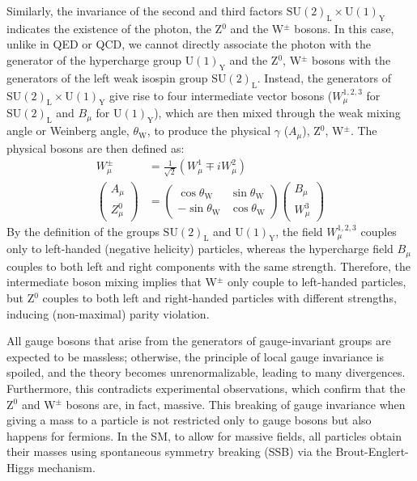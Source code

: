 Similarly, the invariance of the second and third factors $\text{SU}(2)_{\text{L}}\times \text{U}(1)_{\text{Y}}$ indicates the existence of the photon, the Z$^{0}$ and the W$^{\pm}$ bosons. In this case, unlike in QED or QCD, we cannot directly associate the photon with the generator of the hypercharge group $\text{U}(1)_{\text{Y}}$ and the Z$^{0}$, W$^{\pm}$ bosons with the generators of the left weak isospin group $\text{SU}(2)_{\text{L}}$. Instead, the generators of $\text{SU}(2)_{\text{L}}\times \text{U}(1)_{\text{Y}}$ give rise to four intermediate vector bosons ($W_\mu^{1,2,3}$ for $\text{SU}(2)_{\text{L}}$ and $B_\mu$ for $\text{U}(1)_{\text{Y}}$), which are then mixed through the weak mixing angle or Weinberg angle, $\theta_{\text{W}}$, to produce the physical $\gamma$ ($A_\mu$), Z$^{0}$, W$^{\pm}$. The physical bosons are then defined as:
\begin{align*}
    W_\mu^{\pm} &= \frac{1}{\sqrt{2}}(W_\mu^{1}\mp iW_\mu^{2})\\
    \begin{pmatrix}
        A_\mu \\
        Z^{0}_\mu
    \end{pmatrix}
    &=
    \begin{pmatrix}
        \cos{\theta_{\text{W}}} & \sin{\theta_{\text{W}}} \\
        -\sin{\theta_{\text{W}}} & \cos{\theta_{\text{W}}}
    \end{pmatrix}
    \begin{pmatrix}
        B_\mu \\
        W^{3}_\mu
    \end{pmatrix}
\end{align*}
By the definition of the groups $\text{SU}(2)_{\text{L}}$ and $\text{U}(1)_{\text{Y}}$, the field $W_\mu^{1,2,3}$ couples only to left-handed (negative helicity) particles, whereas the hypercharge field $B_\mu$ couples to both left and right components with the same strength. Therefore, the intermediate boson mixing implies that W$^{\pm}$ only couple to left-handed particles, but Z$^{0}$ couples to both left and right-handed particles with different strengths, inducing (non-maximal) parity violation.

All gauge bosons that arise from the generators of gauge-invariant groups are expected to be massless; otherwise, the principle of local gauge invariance is spoiled, and the theory becomes unrenormalizable, leading to many divergences. Furthermore, this contradicts experimental observations, which confirm that the Z$^{0}$ and W$^{\pm}$ bosons are, in fact, massive. This breaking of gauge invariance when giving a mass to a particle is not restricted only to gauge bosons but also happens for fermions. In the SM, to allow for massive fields, all particles obtain their masses using spontaneous symmetry breaking (SSB) via the Brout-Englert-Higgs mechanism.

